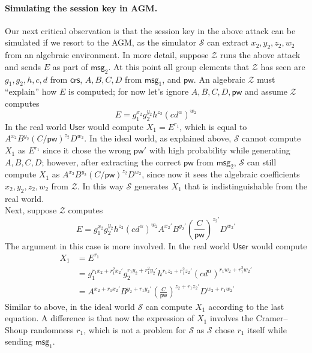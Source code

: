 \documentclass[12pt,a4paper]{article}
\newcommand{\simulator}{\mathcal{S}}
\newcommand{\env}{\mathcal{Z}}
\newcommand{\user}{\mathsf{User}}
\newcommand{\pw}{\mathsf{pw}}
\newcommand{\crs}{\mathsf{crs}}
\newcommand{\msg}[1]{\mathsf{msg}_{#1}}
\begin{document}
\paragraph{Simulating the session key in AGM.}

Our next critical observation is that the session key in the above attack can be simulated if we resort to the AGM, as the simulator $\simulator$ can extract $x_2, y_2, z_2, w_2$ from an algebraic environment. In more detail, suppose $\env$ runs the above attack and sends $E$ as part of $\msg{2}$. At this point all group elements that $\env$ has seen are $g_1,g_2,h,c,d$ from $\crs$, $A,B,C,D$ from $\msg{1}$, and $\pw$. An algebraic $\env$ must ``explain'' how $E$ is computed; for now let's ignore $A,B,C,D,\pw$ and assume $\env$ computes
\[
E = g_1^{x_2}g_2^{y_2}h^{z_2}(cd^\alpha)^{w_2}
\]
In the real world $\user$ would compute $X_1 = E^{r_1}$, which is equal to $A^{x_2}B^{y_2}(C/\pw)^{z_2}D^{w_2}$. In the ideal world, as explained above, $\simulator$ cannot compute $X_1$ as $E^{r_1}$ since it chose the wrong $\pw'$ with high probability while generating $A,B,C,D$; however, after extracting the correct $\pw$ from $\msg{2}$, $\simulator$ can still compute $X_1$ as $A^{x_2}B^{y_2}(C/\pw)^{z_2}D^{w_2}$, since now it sees the algebraic coefficients $x_2,y_2,z_2,w_2$ from $\env$. In this way $\simulator$ generates $X_1$ that is indistinguishable from the real world.\\

Next, suppose $\env$ computes
\[
E = g_1^{x_2}g_2^{y_2}h^{z_2}(cd^\alpha)^{w_2}A^{x_2'}B^{y_2'}\left(\frac{C}{\pw}\right)^{z_2'}D^{w_2'}
\]
The argument in this case is more involved. In the real world $\user$ would compute
\begin{align*}
X_1 &= E^{r_1} \\
    &= g_1^{r_1x_2+r_1^2 x_2'} g_2^{r_1y_2+r_1^2 y_2'} h^{r_1z_2+r_1^2 z_2'} (cd^\alpha)^{r_1w_2+r_1^2 w_2'} \\
    &= A^{x_2+r_1x_2'} B^{y_2+r_1y_2'} \left(\frac{C}{\pw}\right)^{z_2+r_1z_2'} D^{w_2+r_1w_2'}
\end{align*}	
Similar to above, in the ideal world $\simulator$ can compute $X_1$ according to the last equation. A difference is that now the expression of $X_1$ involves the Cramer--Shoup randomness $r_1$, which is not a problem for $\simulator$ as $\simulator$ chose $r_1$ itself while sending $\msg{1}$.\\
\end{document}
